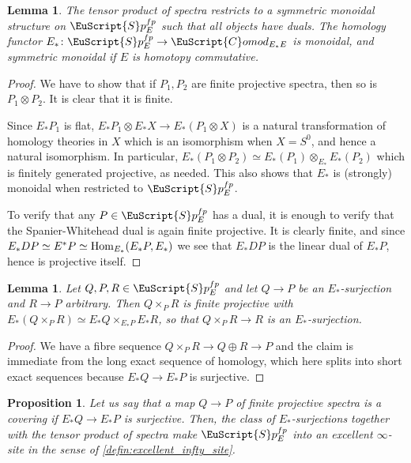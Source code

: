 \documentclass[oneside,a4paper]{amsart}
\newcommand{\euscr}[1]{\EuScript{#1}} %
\newcommand{\Hom}{\textnormal{Hom}} %
\newcommand{\spectra}{\euscr{S}p} %
\newcommand{\spectrafp}{\spectra_{E}^{fp}} %
\newcommand{\Comod}{\euscr{C}omod} %
\newcommand{\ComodE}{\Comod_{E_{*}E}} %
\theoremstyle{plain}
\newtheorem{lemma}[thm]{Lemma}
\newtheorem{prop}[thm]{Proposition}
\theoremstyle{definition}
\theoremstyle{remark}
\begin{document}
\begin{lemma}
\label{lemma:smash_products_makes_finite_projective_spectra_rigid_symmetric_monoidal_and_homology_monoidal}
The tensor product of spectra restricts to a symmetric monoidal structure on $\spectra_{E}^{fp}$ such that all objects have duals. The homology functor $E_{*} \colon \spectrafp \rightarrow \ComodE$ is monoidal, and symmetric monoidal if $E$ is homotopy commutative.  
\end{lemma}

\begin{proof}
We have to show that if $P_{1}, P_{2}$ are finite projective spectra, then so is $P_{1} \otimes P_{2}$. It is clear that it is finite. 

Since $E_{*}P_{1}$ is flat, $E_{*} P_{1} \otimes E_{*}X \rightarrow E_{*}(P_{1} \otimes X)$ is a natural transformation of homology theories in $X$ which is an isomorphism when $X = S^{0}$, and hence a natural isomorphism. In particular, $E_{*}(P_{1} \otimes P_{2}) \simeq E_{*}(P_{1}) \otimes_{E_{*}} E_{*}(P_{2})$ which is finitely generated projective, as needed. This also shows that $E_{*}$ is (strongly) monoidal when restricted to $\spectrafp$.

To verify that any $P \in \spectrafp$ has a dual, it is enough to verify that the Spanier-Whitehead dual is again finite projective. It is clearly finite, and since $E_{*}DP \simeq E^{*}P \simeq \Hom_{E_{*}}(E_{*}P, E_{*})$ we see that $E_{*}DP$ is the linear dual of $E_{*}P$, hence is projective itself. 
\end{proof}

\begin{lemma}
\label{lemma:homology_preserves_pullbacks_along_coverings}
Let $Q, P, R \in \spectra_{E}^{fp}$ and let $Q \rightarrow P$ be an $E_{*}$-surjection and $R \rightarrow P$ arbitrary. Then $Q \times_{P} R$ is finite projective with $E_{*}(Q \times _{P} R) \simeq E_{*}Q \times _{E_{*}P} E_{*}R$, so that $Q \times _{P} R \rightarrow R$ is an $E_{*}$-surjection. 
\end{lemma}

\begin{proof}
We have a fibre sequence $Q \times _{P} R \rightarrow Q \oplus R \rightarrow P$ and the claim is immediate from the long exact sequence of homology, which here splits into short exact sequences because $E_{*}Q \rightarrow E_{*}P$ is surjective. 
\end{proof}

\begin{prop}
\label{prop:homology_surjections_make_fpspectra_into_an_excellent_inftysite}
Let us say that a map $Q \rightarrow P$ of finite projective spectra is a \emph{covering} if $E_{*}Q \rightarrow E_{*}P$ is surjective. Then, the class of $E_{*}$-surjections together with the tensor product of spectra make $\spectrafp$ into an excellent $\infty$-site in the sense of \cref{defin:excellent_infty_site}.
\end{prop}
\end{document}
